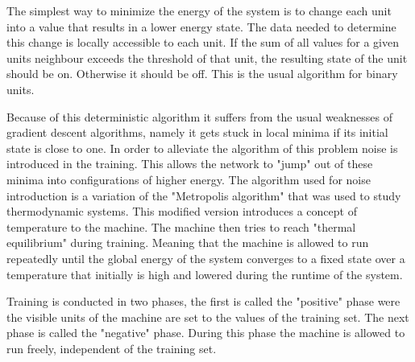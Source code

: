 \documentclass[12pt, a4paper]{article}
\begin{document}
The simplest way to minimize the energy of the system is to change each unit into a value that results in a lower energy state. The data needed to determine this change is locally accessible to each unit. If the sum of all values for a given units neighbour exceeds the threshold of that unit, the resulting state of the unit should be on. Otherwise it should be off. This is the usual algorithm for binary units.

Because of this deterministic algorithm it suffers from the usual weaknesses of gradient descent algorithms, namely it gets stuck in local minima if its initial state is close to one. In order to alleviate the algorithm of this problem noise is introduced in the training. This allows the network to "jump" out of these minima into configurations of higher energy. The algorithm used for noise introduction is a variation of the "Metropolis algorithm" \cite{metropolis1953equation} that was used to study thermodynamic systems. This modified version introduces a concept of temperature to the machine. The machine then tries to reach "thermal equilibrium" during training. Meaning that the machine is allowed to run repeatedly until the global energy of the system converges to a fixed state over a temperature that initially is high and lowered during the runtime of the system.


Training is conducted in two phases, the first is called the "positive" phase were the visible units of the machine are set to the values of the training set. The next phase is called the "negative" phase. During this phase the machine is allowed to run freely, independent of the training set.






\end{document}
